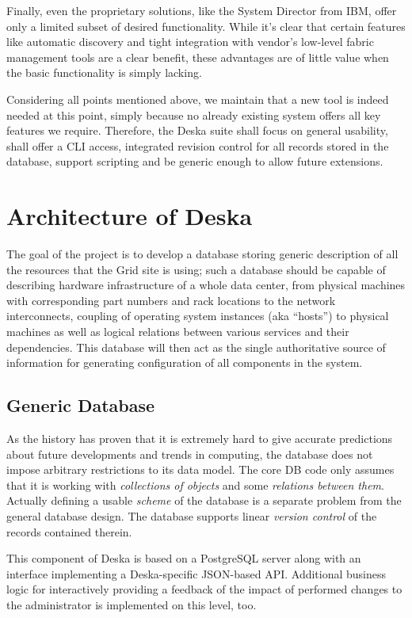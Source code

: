\documentclass[a4paper]{jpconf}
\begin{document}
Finally, even the proprietary solutions, like the System Director from IBM, offer only a limited subset of desired functionality.
While it's clear that certain features like automatic discovery and tight integration with vendor's low-level fabric management tools
are a clear benefit, these advantages are of little value when the basic functionality is simply lacking.

Considering all points mentioned above, we maintain that a new tool is indeed needed at this point, simply because no already existing
system offers all key features we require.  Therefore, the Deska suite shall focus on general usability, shall offer a CLI access,
integrated revision control for all records stored in the database, support scripting and be generic enough to allow future extensions.

\section{Architecture of Deska}

The goal of the project is to develop a database storing generic description of all the resources that the Grid site is using;
such a database should be capable of describing hardware infrastructure of a whole data center, from physical machines with
corresponding part numbers and rack locations to the network interconnects, coupling of operating system instances (aka ``hosts'') to
physical machines as well as logical relations between various services and their dependencies.  This database will then act as the
single authoritative source of information for generating configuration of all components in the system.

\subsection{Generic Database}

As the history has proven that it is extremely hard to give accurate predictions about future developments and trends in computing,
the database does not impose arbitrary restrictions to its data model.  The core DB code only assumes that it is working with {\em
collections of objects} and some {\em relations between them}. Actually defining a usable {\em scheme} of the database is a separate
problem from the general database design.  The database supports linear {\em version control} of the records contained therein.

This component of Deska is based on a PostgreSQL server along with an interface implementing a Deska-specific JSON-based API.
Additional business logic for interactively providing a feedback of the impact of performed changes to the administrator is implemented
on this level, too.
\end{document}
